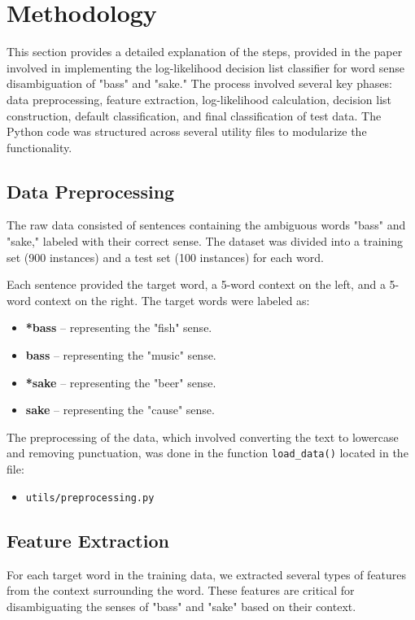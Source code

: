 \documentclass[journal,onecolumn]{IEEEtran}
\begin{document}
\section{Methodology}
This section provides a detailed explanation of the steps, provided in the paper \cite{yarowsky-1994-decision} involved in implementing the log-likelihood decision list classifier for word sense disambiguation of "bass" and "sake." The process involved several key phases: data preprocessing, feature extraction, log-likelihood calculation, decision list construction, default classification, and final classification of test data. The Python code was structured across several utility files to modularize the functionality.

\subsection{Data Preprocessing}
The raw data consisted of sentences containing the ambiguous words "bass" and "sake," labeled with their correct sense. The dataset was divided into a training set (900 instances) and a test set (100 instances) for each word.

Each sentence provided the target word, a 5-word context on the left, and a 5-word context on the right. The target words were labeled as:
\begin{itemize}
    \item \textbf{*bass} – representing the "fish" sense.
    \item \textbf{bass} – representing the "music" sense.
    \item \textbf{*sake} – representing the "beer" sense.
    \item \textbf{sake} – representing the "cause" sense.
\end{itemize}

The preprocessing of the data, which involved converting the text to lowercase and removing punctuation, was done in the function \texttt{load\_data()} located in the file:
\begin{itemize}
    \item \texttt{utils/preprocessing.py}
\end{itemize}

\subsection{Feature Extraction}
For each target word in the training data, we extracted several types of features from the context surrounding the word. These features are critical for disambiguating the senses of "bass" and "sake" based on their context.
\end{document}
